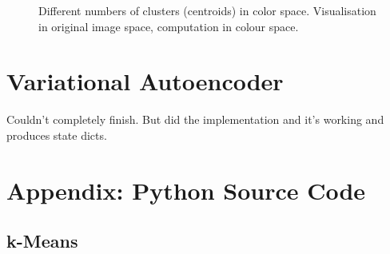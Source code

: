 \documentclass[11pt,a4paper,oneside]{article}
\begin{document}
\begin{figure}[ht]
   \centering
      \qquad
      \qquad
   \caption{Different numbers of clusters (centroids) in color space. Visualisation in original image space, computation in colour space.}
\end{figure}

\FloatBarrier

\section{Variational Autoencoder}


Couldn't completely finish. But did the implementation and it's working and produces state dicts.

\newpage
\section{Appendix: Python Source Code}
\label{sec:app}

\subsection{k-Means}

\end{document}

